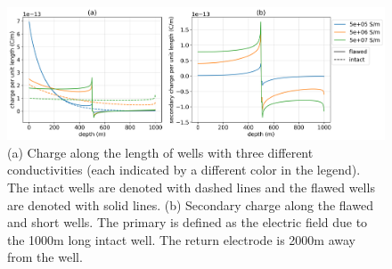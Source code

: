 \begin{figure}
    \begin{center}
    \includegraphics[width=\textwidth]{figures/casing_charge_sigma_casing.png}
    \end{center}
\caption{
    (a) Charge along the length of wells with three different
    conductivities (each indicated by a different color in the legend).
    The intact wells are denoted with dashed lines and the flawed wells
    are denoted with solid lines.
    (b) Secondary charge along the flawed and short wells. The primary is
    defined as the electric field due to the 1000m long intact well. The return electrode
    is 2000m away from the well.
}
\label{fig:casing_charge_sigma_casing}
\end{figure}
